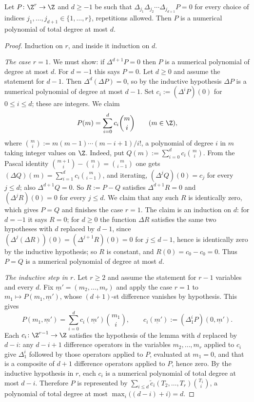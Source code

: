 \begin{lemma}
\label{lem:deg-difference-criterion}
Let $P\colon\Z^r\to\Z$ and $d\geq-1$ be such that
$\Delta_{j_1}\Delta_{j_2}\cdots\Delta_{j_{d+1}}P=0$ for every choice of
indices $j_1,\dots,j_{d+1}\in\{1,\dots,r\}$, repetitions allowed.  Then $P$ is
a numerical polynomial of total degree at most $d$.
\end{lemma}
\begin{proof}
Induction on $r$, and inside it induction on $d$.

\emph{The case $r=1$.}  We must show: if $\Delta^{d+1}P=0$ then $P$ is a
numerical polynomial of degree at most $d$.  For $d=-1$ this says $P=0$.  Let
$d\geq0$ and assume the statement for $d-1$.  Then $\Delta^{d}(\Delta P)=0$, so
by the inductive hypothesis $\Delta P$ is a numerical polynomial of degree at
most $d-1$.  Set $c_i:=(\Delta^iP)(0)$ for $0\leq i\leq d$; these are integers.
We claim
\[
  P(m)=\sum_{i=0}^{d}c_i\binom{m}{i}\qquad(m\in\Z),
\]
where $\binom{m}{i}:=m(m-1)\cdots(m-i+1)/i!$, a polynomial of degree $i$ in $m$
taking integer values on $\Z$.  Indeed, put
$Q(m):=\sum_{i=0}^{d}c_i\binom{m}{i}$.  From the Pascal identity
$\binom{m+1}{i}-\binom{m}{i}=\binom{m}{i-1}$ one gets
$(\Delta Q)(m)=\sum_{i=1}^{d}c_i\binom{m}{i-1}$, and iterating,
$(\Delta^jQ)(0)=c_j$ for every $j\leq d$; also $\Delta^{d+1}Q=0$.  So
$R:=P-Q$ satisfies $\Delta^{d+1}R=0$ and $(\Delta^jR)(0)=0$ for every
$j\leq d$.  We claim that any such $R$ is identically zero, which gives $P=Q$
and finishes the case $r=1$.  The claim is an induction on $d$: for $d=-1$ it
says $R=0$; for $d\geq0$ the function $\Delta R$ satisfies the same two
hypotheses with $d$ replaced by $d-1$, since
$(\Delta^j(\Delta R))(0)=(\Delta^{j+1}R)(0)=0$ for $j\leq d-1$, hence is
identically zero by the inductive hypothesis; so $R$ is constant, and
$R(0)=c_0-c_0=0$.  Thus $P=Q$ is a numerical polynomial of degree at most
$d$.

\emph{The inductive step in $r$.}  Let $r\geq2$ and assume the statement for
$r-1$ variables and every $d$.  Fix $\underline m'=(m_2,\dots,m_r)$ and apply
the case $r=1$ to $m_1\mapsto P(m_1,\underline m')$, whose $(d+1)$-st
difference vanishes by hypothesis.  This gives
\[
  P(m_1,\underline m')=\sum_{i=0}^{d}c_i(\underline m')\binom{m_1}{i},
  \qquad c_i(\underline m'):=(\Delta_1^iP)(0,\underline m').
\]
Each $c_i\colon\Z^{r-1}\to\Z$ satisfies the hypothesis of the lemma with $d$
replaced by $d-i$: any $d-i+1$ difference operators in the variables
$m_2,\dots,m_r$ applied to $c_i$ give $\Delta_1^i$ followed by those
operators applied to $P$, evaluated at $m_1=0$, and that is a composite of
$d+1$ difference operators applied to $P$, hence zero.  By the inductive
hypothesis in $r$, each $c_i$ is a numerical polynomial of total degree at most
$d-i$.  Therefore $P$ is represented by
$\sum_{i\leq d}\widetilde c_i(T_2,\dots,T_r)\binom{T_1}{i}$, a polynomial of
total degree at most $\max_i\bigl((d-i)+i\bigr)=d$.
\end{proof}

